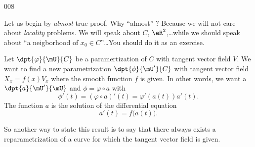 \begin{corrige}{008}

Let us begin by \emph{almost} true proof. Why ``almost'' ? Because we will not care about \emph{locality} problems. We will speak about $C$, $\eR^2$,\ldots while we should speak about ``a neigborhood of $x_0\in C$''\ldots You should do it as an exercise.

Let $\dpt{ \varphi }{ \mU }{ C }$ be a paramertization of $C$ with tangent vector field $V$. We want to find a new parametrization $\dpt{ \phi }{ \mU' }{ C }$ with tangent vector field $X_x=f(x)V_x$ where the smooth function $f$ is given. In other words, we want a $\dpt{ a }{ \mU' }{ \mU }$ and $\phi=\varphi\circ a$ with
\[ 
  \phi'(t)=(\varphi\circ a)'(t)=\varphi'(a(t))a'(t).
\]
The function $a$ is the solution of the differential equation
\[ 
  a'(t)=f\big( a(t) \big).
\]

So another way to state this result is to say that there always exists a reparametrization of a curve for which the tangent vector field is given.

\end{corrige}
